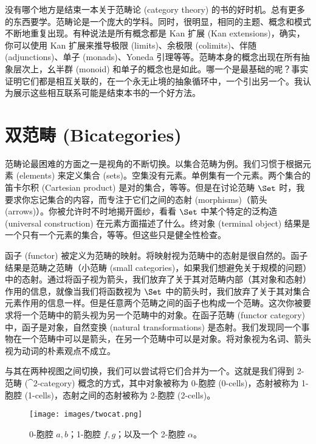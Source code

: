 
\lettrine[lhang=0.17]{没}{有哪个地方}是结束一本关于范畴论 (category theory) 的书的好时机。总有更多的东西要学。范畴论是一个庞大的学科。同时，很明显，相同的主题、概念和模式不断地重复出现。有种说法是所有概念都是 Kan 扩展 (Kan extensions)，确实，你可以使用 Kan 扩展来推导极限 (limits)、余极限 (colimits)、伴随 (adjunctions)、单子 (monads)、Yoneda 引理等等。范畴本身的概念出现在所有抽象层次上，幺半群 (monoid) 和单子的概念也是如此。哪一个是最基础的呢？事实证明它们都是相互关联的，在一个永无止境的抽象循环中，一个引出另一个。我认为展示这些相互联系可能是结束本书的一个好方法。

\section{双范畴 (Bicategories)}

范畴论最困难的方面之一是视角的不断切换。以集合范畴为例。我们习惯于根据元素 (elements) 来定义集合 (sets)。空集没有元素。单例集有一个元素。两个集合的笛卡尔积 (Cartesian product) 是对的集合，等等。但是在讨论范畴 $\Set$ 时，我要求你忘记集合的内容，而专注于它们之间的态射 (morphisms)（箭头 (arrows)）。你被允许时不时地揭开面纱，看看 $\Set$ 中某个特定的泛构造 (universal construction) 在元素方面描述了什么。终对象 (terminal object) 结果是一个只有一个元素的集合，等等。但这些只是健全性检查。

函子 (functor) 被定义为范畴的映射。将映射视为范畴中的态射是很自然的。函子结果是范畴之范畴（小范畴 (small categories)，如果我们想避免关于规模的问题）中的态射。通过将函子视为箭头，我们放弃了关于其对范畴内部（其对象和态射）作用的信息，就像当我们将函数视为 $\Set$ 中的箭头时，我们放弃了关于其对集合元素作用的信息一样。但是任意两个范畴之间的函子也构成一个范畴。这次你被要求将一个范畴中的箭头视为另一个范畴中的对象。在函子范畴 (functor category) 中，函子是对象，自然变换 (natural transformations) 是态射。我们发现同一个事物在一个范畴中可以是箭头，在另一个范畴中可以是对象。将对象视为名词、箭头视为动词的朴素观点不成立。

与其在两种视图之间切换，我们可以尝试将它们合并为一个。这就是我们得到 2-范畴 ($\cat{2}$-category) 概念的方式，其中对象被称为 0-胞腔 (0-cells)，态射被称为 1-胞腔 (1-cells)，态射之间的态射被称为 2-胞腔 (2-cells)。

\begin{figure}[H]
  \centering
  \texttt{[image: images/twocat.png]}
  \caption{0-胞腔 $a, b$；1-胞腔 $f, g$；以及一个 2-胞腔 $\alpha$。}
\end{figure}

